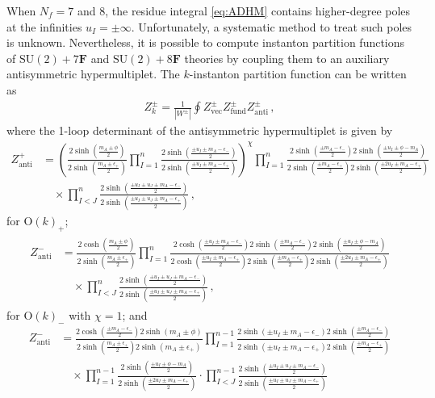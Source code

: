 \documentclass[11pt, a4paper]{article}
\theoremstyle{definition}
\begin{document}
When $ N_f = 7 $ and $ 8 $, the residue integral \eqref{eq:ADHM} contains higher-degree poles at the infinities $ u_I = \pm \infty $. Unfortunately, a systematic method to treat such poles is unknown. Nevertheless, it is possible to compute instanton partition functions of $ \mathrm{SU}(2)+7\mathbf{F} $ and $ \mathrm{SU}(2)+8\mathbf{F} $ theories by coupling them to an auxiliary antisymmetric hypermultiplet. The $ k $-instanton partition function can be written as
\begin{align}
    Z_k^\pm = \frac{1}{|W^\pm|} \oint Z_{\mathrm{vec}}^\pm Z_{\mathrm{fund}}^{\pm} Z_{\mathrm{anti}}^\pm \, ,
\end{align}
where the 1-loop determinant of the antisymmetric hypermultiplet is given by
\begin{align}
    Z_{\mathrm{anti}}^+ &= \left( \frac{2\sinh(\frac{m_A\pm \phi}{2})}{2\sinh(\frac{m_A\pm \epsilon_+}{2})} \prod_{I=1}^n \frac{2\sinh(\frac{\pm u_I \pm m_A - \epsilon_-}{2})}{2\sinh(\frac{\pm u_I \pm m_A - \epsilon_+}{2})} \right)^\chi \! \prod_{I=1}^n \frac{2\sinh(\frac{\pm m_A - \epsilon_-}{2}) 2\sinh(\frac{\pm u_I \pm \phi - m_A}{2})}{2\sinh(\frac{\pm m_A-\epsilon_+}{2}) 2\sinh(\frac{\pm 2u_I \pm m_A - \epsilon_+}{2})} \nonumber \\
    &\quad \times \prod_{I<J}^n \frac{2\sinh(\frac{\pm u_I \pm u_J \pm m_A - \epsilon_-}{2})}{2\sinh(\frac{\pm u_I \pm u_J \pm m_A - \epsilon_+}{2})} \, ,
\end{align}
for $ \mathrm{O}(k)_+ $;
\begin{align}
    \begin{aligned}
        Z_{\mathrm{anti}}^- &= \frac{2\cosh(\frac{m_A\pm \phi}{2})}{2\sinh(\frac{m_A\pm \epsilon_+}{2})} \prod_{I=1}^n \frac{ 2\cosh(\frac{\pm u_I \pm m_A - \epsilon_-}{2}) 2\sinh(\frac{\pm m_A - \epsilon_-}{2}) 2\sinh(\frac{\pm u_I \pm \phi - m_A}{2})}{2\cosh(\frac{\pm u_I \pm m_A - \epsilon_+}{2}) 2\sinh(\frac{\pm m_A-\epsilon_+}{2}) 2\sinh(\frac{\pm 2u_I \pm m_A - \epsilon_+}{2})} \\
        &\quad \times \prod_{I<J}^n \frac{2\sinh(\frac{\pm u_I \pm u_J \pm m_A - \epsilon_-}{2})}{2\sinh(\frac{\pm u_I \pm u_J \pm m_A - \epsilon_+}{2})} \, ,
    \end{aligned}
\end{align}
for $ \mathrm{O}(k)_- $ with $ \chi=1 $; and
\begin{align}
        Z_{\mathrm{anti}}^- &= \frac{2\cosh(\frac{\pm m_A - \epsilon_-}{2}) 2\sinh(m_A\pm \phi)}{2\sinh(\frac{m_A \pm \epsilon_+}{2}) 2\sinh(m_A\pm \epsilon_+)} \prod_{I=1}^{n-1} \frac{2\sinh(\pm u_I \pm m_A - \epsilon_-) 2\sinh(\frac{\pm m_A-\epsilon_-}{2}) }{2\sinh(\pm u_I \pm m_A - \epsilon_+) 2\sinh(\frac{\pm m_A-\epsilon_+}{2})} \nonumber \\
        &\quad \times \prod_{I=1}^{n-1} \frac{2\sinh(\frac{\pm u_I \pm \phi - m_A}{2})}{2\sinh(\frac{\pm 2u_I \pm m_A - \epsilon_+}{2})} \cdot \prod_{I<J}^{n-1} \frac{2\sinh(\frac{\pm u_I \pm u_J \pm m_A - \epsilon_-}{2})}{2\sinh(\frac{\pm u_I \pm u_J \pm m_A - \epsilon_+}{2})}
\end{align}
\end{document}
